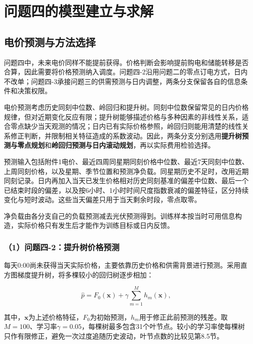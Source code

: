 \section{问题四的模型建立与求解}

\subsection{电价预测与方法选择}
问题四中，未来电价同样不能提前获得。价格判断会影响提前购电和储能转移是否合算，因此需要将价格预测纳入调度。问题四-2沿用问题二的零点订电方式，日内不改单；问题四-3承接问题三的供需预测与日内调整，两条分支保留各自的信息条件和决策权限。

电价预测考虑历史同刻中位数、岭回归和提升树。同刻中位数保留常见的日内价格规律，但对近期变化反应有限；提升树能够描述价格与多种因素的非线性关系，适合零点缺少当天观测的情况；日内已有实际价格参照，岭回归则能用清楚的线性关系修正判断，并限制相关特征造成的系数波动。因此，两条分支分别选用\textbf{提升树预测与零点规划}和\textbf{岭回归预测与日内滚动规划}，再以实际费用检验选择。

预测输入包括附件1电价、最近四周同星期同刻价格中位数、最近7天同刻中位数、上周同刻价格，以及星期、季节位置和预测净负载。同星期历史不足时，改用近期同刻记录。日内再加入当天已发生价格相对历史同刻基准的偏差中位数、最后一个已结束时段的偏差，以及按6小时、1小时时间尺度指数衰减的偏差特征，区分持续变化与短时波动。这些当天偏差只用于当天剩余时段，零点取零。

净负载由各分支自己的负载预测减去光伏预测得到。训练样本按当时可用信息构造，实际价格只有发生后才能作为训练目标或日内反馈。

\subsubsection*{（1）问题四-2：提升树价格预测}

每天0:00尚未获得当天实际价格，主要依靠历史价格和供需背景进行预测。采用直方图梯度提升树，将多棵较小的回归树逐步相加：

\begin{equation}
\hat{p}
=
F_0(\mathbf{x})
+
\gamma
\sum_{m=1}^{M}
h_m(\mathbf{x}),
\end{equation}

其中，$\mathbf{x}$为上述价格特征，$F_0$为初始预测，$h_m$用于修正此前预测的残差。取$M=100$、学习率$\gamma=0.05$，每棵树最多包含31个叶节点。较小的学习率使每棵树只作有限修正，避免一次过度追随历史波动，叶节点数的比较见第8.5节。

